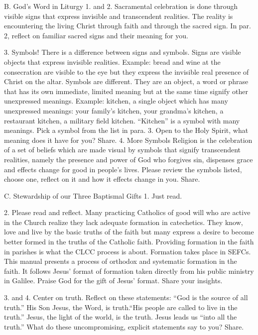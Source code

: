 \documentclass[oneside]{book}
\begin{document}
B. God's Word in Liturgy
1. and 2. Sacramental celebration is done through visible signs that express
invisible and transcendent realities. The reality is encountering the living
Christ through faith and through the sacred sign. In par. 2, reflect on familiar
sacred signs and their meaning for you.

3. Symbols!
There is a difference between signs and symbols. Signs are visible objects that
express invisible realities. Example: bread and wine at the consecration are
visible to the eye but they express the invisible real presence of Christ on the
altar. Symbols are different. They are an object, a word or phrase that has its
own immediate, limited meaning but at the same time signify other unexpressed
meanings. Example: kitchen, a single object which has many unexpressed meanings:
your family's kitchen, your grandma's kitchen, a restaurant kitchen, a military
field kitchen. ``Kitchen'' is a symbol with many meanings. Pick a symbol from
the list in para. 3. Open to the Holy Spirit, what meaning does it have for you?
Share.
4. More Symbols
Religion is the celebration of a set of beliefs which are made visual by symbols
that signify transcendent realities, namely the presence and power of God who
forgives sin, dispenses grace and effects change for good in people's
lives. Please review the symbols listed, choose one, reflect on it and how it
effects change in you. Share.

C. Stewardship of our Three Baptismal Gifts
1. Just read.

2. Please read and reflect. Many practicing Catholics of good will who are
active in the Church realize they lack adequate formation in catechetics. They
know, love and live by the basic truths of the faith but many express a desire
to become better formed in the truths of the Catholic faith. Providing formation
in the faith in parishes is what the CLCC process is about. Formation takes
place in SEFCs. This manual presents a process of orthodox and systematic
formation in the faith. It follows Jesus' format of formation taken directly
from his public ministry in Galilee. Praise God for the gift of Jesus'
format. Share your insights.

3. and 4. Center on truth. Reflect on these statements: ``God is the source of
all truth.'' His Son Jesus, the Word, is truth.``His people are called to live
in the truth.'' Jesus, the light of the world, is the truth. Jesus leads us
``into all the truth.'' What do these uncompromising, explicit statements say to
you? Share.
\end{document}
